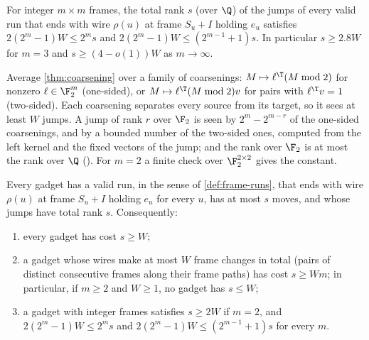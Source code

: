\begin{theorem}\label{thm:mod2m}
For integer $m\times m$ frames, the total rank $s$ (over $\Q$) of the jumps of every valid run that ends with
wire $\rho(u)$ at frame $S_u+I$ holding $e_u$ satisfies
$2(2^m-1)W\le2^ms$ and $2(2^m-1)W\le(2^{m-1}+1)s$. In particular $s\ge2.8W$ for $m=3$ and
$s\ge(4-o(1))W$ as $m\to\infty$.
\end{theorem}

\begin{outline}
Average \cref{thm:coarsening} over a family of coarsenings: $M\mapsto\ell^{\T}(M\bmod2)$ for nonzero
$\ell\in\F_2^m$ (one-sided), or $M\mapsto\ell^{\T}(M\bmod2)v$ for pairs with $\ell^{\T}v=1$ (two-sided). Each
coarsening separates every source from its target, so it sees at least $W$ jumps. A jump of rank $r$ over
$\F_2$ is seen by $2^m-2^{m-r}$ of the one-sided coarsenings, and by a bounded number of the two-sided ones,
computed from the left kernel and the fixed vectors of the jump; and the rank over $\F_2$ is at most the
rank over $\Q$ (). For $m=2$ a finite check over $\F_2^{2\times2}$ gives the
constant.
\end{outline}


\begin{proposition}\label{prop:gadget-runs}
\notformalized
Every gadget has a valid run, in the sense of \cref{def:frame-runs}, that ends with wire $\rho(u)$ at frame
$S_u+I$ holding $e_u$ for every $u$, has at most $s$ moves, and whose jumps have total rank $s$. Consequently:
\begin{enumerate}[label=(\alph*)]
\item every gadget has cost $s\ge W$;
\item a gadget whose wires make at most $W$ frame changes in total (pairs of distinct consecutive frames along their frame paths) has cost $s\ge Wm$; in particular, if
$m\ge2$ and $W\ge1$, no gadget has $s\le W$;
\item a gadget with integer frames satisfies $s\ge2W$ if $m=2$, and $2(2^m-1)W\le2^ms$ and
$2(2^m-1)W\le(2^{m-1}+1)s$ for every $m$.
\end{enumerate}
\end{proposition}

